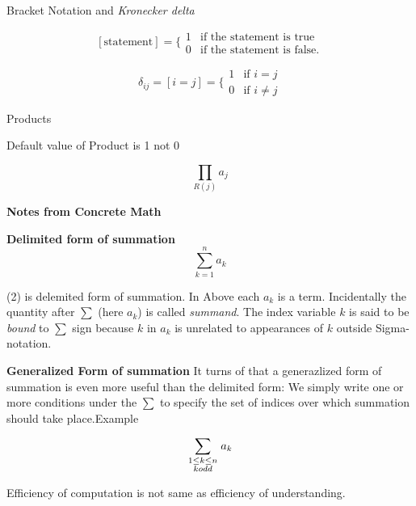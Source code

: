 \documentclass[12pt]{article}
\begin{document}
   Bracket Notation and {\sl Kronecker delta}

   $$[\mbox{statement}] = \Biggr\{\begin{array}{ll} 1 & \mbox{if the statement is true}\\
     0 & \mbox{if the statement is false.}
     \end{array}
   $$

   $$\delta_{ij} = [i = j] = \Biggr\{ \begin{array}{ll} 1 & \mbox{if $i = j$} \\
     0 &  \mbox{if $i \ne j$} 
   \end{array} $$


  \begin{center}
    Products
  \end{center}

  Default value of Product is 1 not 0

  \begin{equation}
    \prod_{R(j)}a_j
  \end{equation}

  {\large \bf Notes from Concrete Math}

  {\bf Delimited form of summation}
  \begin{equation}
    \sum_{k=1}^{n} a_k 
  \end{equation}

  (2) is delemited form of summation.
  In Above each $a_k$ is a term.
  Incidentally the quantity after $\sum$ (here $a_k$) is called {\it summand}.
  The index variable $k$ is said to be {\it bound} to $\sum$ sign because $k$ in $a_k$ is unrelated to appearances of $k$ outside Sigma-notation.

  {\bf Generalized Form of summation}
  It turns of that a generazlized form of summation is even more useful than the delimited form: We simply write one or more conditions under the $\sum$ to specify the set of indices over which summation should take place.Example

  \begin{equation}
    \sum_{\scriptstyle 1 \le k \le n \atop \scriptstyle {k odd}} a_k
  \end{equation}

  Efficiency of computation is not same as efficiency of understanding.
\end{document}
